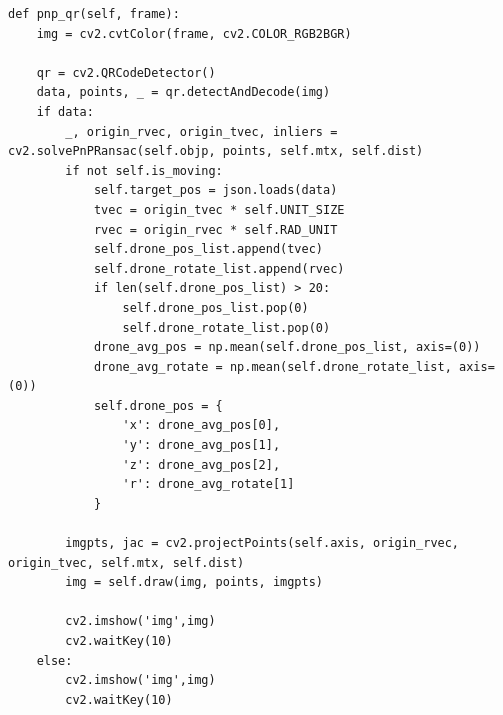 \begin{lstlisting}[caption=pnp\_qr.py,label=src_pnp]
def pnp_qr(self, frame):
    img = cv2.cvtColor(frame, cv2.COLOR_RGB2BGR)

    qr = cv2.QRCodeDetector()
    data, points, _ = qr.detectAndDecode(img)
    if data:
        _, origin_rvec, origin_tvec, inliers = cv2.solvePnPRansac(self.objp, points, self.mtx, self.dist)
        if not self.is_moving:
            self.target_pos = json.loads(data)
            tvec = origin_tvec * self.UNIT_SIZE
            rvec = origin_rvec * self.RAD_UNIT
            self.drone_pos_list.append(tvec)
            self.drone_rotate_list.append(rvec)
            if len(self.drone_pos_list) > 20:
                self.drone_pos_list.pop(0)
                self.drone_rotate_list.pop(0)
            drone_avg_pos = np.mean(self.drone_pos_list, axis=(0))
            drone_avg_rotate = np.mean(self.drone_rotate_list, axis=(0))
            self.drone_pos = {
                'x': drone_avg_pos[0],
                'y': drone_avg_pos[1],
                'z': drone_avg_pos[2],
                'r': drone_avg_rotate[1]
            }

        imgpts, jac = cv2.projectPoints(self.axis, origin_rvec, origin_tvec, self.mtx, self.dist)
        img = self.draw(img, points, imgpts)

        cv2.imshow('img',img)
        cv2.waitKey(10)
    else:
        cv2.imshow('img',img)
        cv2.waitKey(10)
\end{lstlisting}
